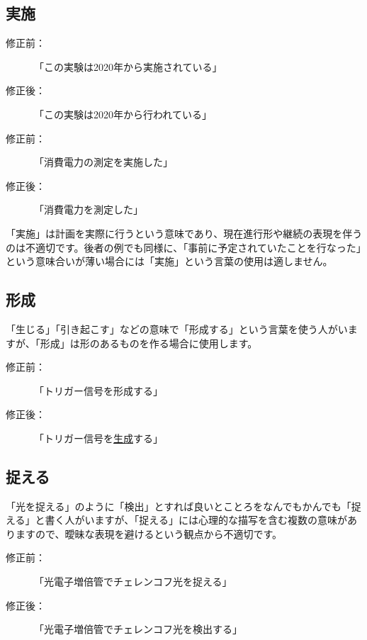 \subsection{実施}

\begin{description}
\item[修正前：]「この実験は2020年から実施されている」
\item[修正後：]「この実験は2020年から行われている」
\end{description}

\begin{description}
\item[修正前：]「消費電力の測定を実施した」
\item[修正後：]「消費電力を測定した」
\end{description}

「実施」は計画を実際に行うという意味であり、現在進行形や継続の表現を伴うのは不適切です。後者の例でも同様に、「事前に予定されていたことを行なった」という意味合いが薄い場合には「実施」という言葉の使用は適しません。

\subsection{形成}

「生じる」「引き起こす」などの意味で「形成する」という言葉を使う人がいますが、「形成」は形のあるものを作る場合に使用します。

\begin{description}
\item[修正前：]「トリガー信号を形成する」
\item[修正後：]「トリガー信号を\underline{生成}する」
\end{description}

\subsection{捉える}

「光を捉える」のように「検出」とすれば良いとことろをなんでもかんでも「捉える」と書く人がいますが、「捉える」には心理的な描写を含む複数の意味がありますので、曖昧な表現を避けるという観点から不適切です。

\begin{description}
\item[修正前：]「光電子増倍管でチェレンコフ光を捉える」
\item[修正後：]「光電子増倍管でチェレンコフ光を検出する」
\end{description}

